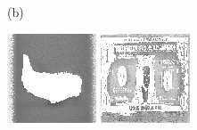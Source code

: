 \documentclass{article}
\begin{document}
\begin{figure}[t]
\begin{minipage}[c]{.21\linewidth}
  \end{minipage}
  \begin{minipage}[c]{.1\linewidth}
    \centering\centerline{(b)}
  \end{minipage}
  \begin{minipage}[c]{.21\linewidth}
    \centering\centerline{\includegraphics[width=\linewidth]{imgs/dennis_cal/airplane/sums/0_0.png}}
  \end{minipage}
  \begin{minipage}[c]{.21\linewidth}
    \centering\centerline{\includegraphics[width=\linewidth]{imgs/dennis_cal/dollar/sums/0_0.png}}

\end{minipage}
\end{figure}
\end{document}
